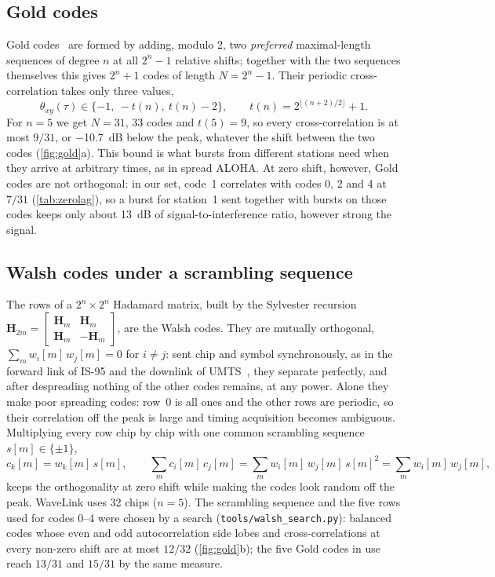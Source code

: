 \documentclass[11pt,a4paper,oneside]{report}
\newcommand{\code}[1]{\texttt{\small #1}}
\begin{document}
\subsection{Gold codes}
Gold codes~\cite{gold1967} are formed by adding, modulo 2, two \emph{preferred} maximal-length
sequences of degree $n$ at all $2^n-1$ relative shifts; together with the two sequences themselves
this gives $2^n+1$ codes of length $N=2^n-1$. Their periodic cross-correlation takes only three values,
\begin{equation}
  \theta_{xy}(\tau)\in\{-1,\ -t(n),\ t(n)-2\},\qquad t(n)=2^{\lfloor (n+2)/2\rfloor}+1 .
\end{equation}
For $n=5$ we get $N=31$, 33 codes and $t(5)=9$, so every cross-correlation is at most $9/31$, or
\SI{-10.7}{dB} below the peak, whatever the shift between the two codes (\cref{fig:gold}a). This bound
is what bursts from different stations need when they arrive at arbitrary times, as in spread ALOHA.
At zero shift, however, Gold codes are not orthogonal: in our set, code~1 correlates with codes 0, 2
and 4 at $7/31$ (\cref{tab:zerolag}), so a burst for station~1 sent together with bursts on those
codes keeps only about \SI{13}{dB} of signal-to-interference ratio, however strong the signal.

\subsection{Walsh codes under a scrambling sequence}\label{sec:walsh}
The rows of a $2^n\times2^n$ Hadamard matrix, built by the Sylvester recursion
$\mathbf H_{2m}=\left[\begin{smallmatrix}\mathbf H_m&\mathbf H_m\\ \mathbf H_m&-\mathbf H_m\end{smallmatrix}\right]$,
are the Walsh codes. They are mutually orthogonal, $\sum_m w_i[m]\,w_j[m]=0$ for $i\neq j$: sent chip
and symbol synchronously, as in the forward link of IS-95 and the downlink of UMTS~\cite{viterbi1995,ts25213},
they separate perfectly, and after despreading nothing of the other codes remains, at any power.
Alone they make poor spreading codes: row~0 is all ones and the other rows are periodic, so their
correlation off the peak is large and timing acquisition becomes ambiguous. Multiplying every row
chip by chip with one common scrambling sequence $s[m]\in\{\pm1\}$,
\begin{equation}
  c_k[m]=w_k[m]\,s[m],\qquad \sum_m c_i[m]\,c_j[m]=\sum_m w_i[m]\,w_j[m]\,s[m]^2=\sum_m w_i[m]\,w_j[m],
\end{equation}
keeps the orthogonality at zero shift while making the codes look random off the peak. WaveLink uses
32 chips ($n=5$). The scrambling sequence and the five rows used for codes 0--4 were chosen by a search
(\code{tools/walsh\_search.py}): balanced codes whose even and odd autocorrelation side lobes and
cross-correlations at every non-zero shift are at most $12/32$ (\cref{fig:gold}b); the five Gold codes in
use reach $13/31$ and $15/31$ by the same measure.
\end{document}
